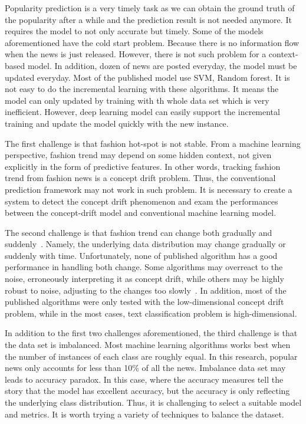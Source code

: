 Popularity prediction is a very timely task as we can obtain the ground truth of the popularity after a while and the prediction result is not needed anymore. It requires the model to not only accurate but timely. Some of the models aforementioned have the cold start problem. Because there is no information flow when the news is just released. However, there is not such problem for a context-based model. In addition, dozen of news are posted everyday, the model must be updated everyday. Most of the published model use SVM, Random forest. It is not easy to do the incremental learning with these algorithms. It means the model can only updated by training with th whole data set which is very inefficient. However, deep learning model can easily support the incremental training and update the model quickly with the new instance. 

The first challenge is that fashion hot-spot is not stable. From a machine learning perspective, fashion trend may depend on some hidden context, not given explicitly in the form of predictive features. In other words, tracking fashion trend from fashion news is a concept drift problem. Thus, the conventional prediction framework may not work in such problem. It is necessary to create a system to detect the concept drift phenomenon and exam the performances between the concept-drift model and conventional machine learning model. 

The second challenge is that fashion trend can change both gradually and suddenly~\cite{behling1985}. Namely, the underlying data distribution may change gradually or suddenly with time. Unfortunately, none of published algorithm has a good performance in handling both change. Some algorithms may overreact to the noise, erroneously interpreting it as concept drift, while others may be highly robust to noise, adjusting to the changes too slowly~\cite{widmer1996learning}. In addition, most of the published algorithms were only tested with the low-dimensional concept drift problem, while in the most cases, text classification problem is high-dimensional. 

In addition to the first two challenges aforementioned, the third challenge is that the data set is imbalanced. Most machine learning algorithms works best when the number of instances of each class are roughly equal. In this research, popular news only accounts for less than 10\% of all the news. Imbalance data set may leads to accuracy paradox. In this case, where the accuracy measures tell the story that the model has excellent accuracy, but the accuracy is only reflecting the underlying class distribution. Thus, it is challenging to select a suitable model and metrics. It is worth trying a variety of techniques to balance the dataset. 

